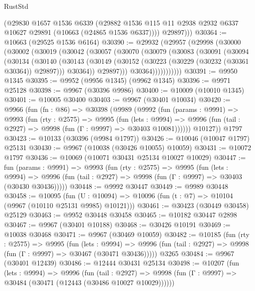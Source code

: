 \begin{lexlean}{RustStd}
\begin{coremodule}
          (@29830
            @1657
            @1536
            @6339
            (@29882 @1536 @115 @11 @2938 @2932 @6337 @10627 @29891 (@10663 (@24865 @1536 @6337))))
          @29897)))
@30364 := @10663 (@29525 @1536 @6164)
@30390 := @29932
    (@29957
      (@29998
        (@30000
          (@30002
            (@30019
              (@30042
                (@30057
                  (@30070
                    (@30079
                      (@30083
                        (@30091
                          (@30094
                            (@30134
                              (@30140
                                (@30143
                                  (@30149
                                    (@30152 (@30223 (@30229 (@30232 (@30361 @30364)) @29897)))
                                    @30364))
                                @29897)))
                          @30364)))))))))))
@30391 := @9950 @1345
@30395 := @9952 (@9956 @1345) (@9962 @1345)
@30396 := @9971 @25128
@30398 := @9967 (@30396 @9986)
@30400 := @10009 (@10010 @1345)
@30401 := @10005 @30400
@30403 := @9967 (@30401 @10034)
@30420 := @9966
    (fun (fn : @86) =>
    @30398
      (@9989
        (@9992
          (fun (params : @9991) =>
          @9993
            (fun (rty : @2575) =>
            @9995
              (fun (lets : @9994) =>
              @9996 (fun (tail : @2927) => @9998 (fun (Γ : @9997) => @30403 @10081))))))
        @10127))
    @1797
@30423 := @10133 (@30396 (@9984 @1797))
@30426 := @10046 (@10047 @1797) @25131
@30430 := @9967 (@10038 (@30426 @10055) @10059)
@30431 := @10072 @1797
@30436 := @10069 (@10071 @30431 @25134 @10027 @10029)
@30447 := fun (params : @9991) =>
  @9993
    (fun (rty : @2575) =>
    @9995
      (fun (lets : @9994) =>
      @9996 (fun (tail : @2927) => @9998 (fun (Γ : @9997) => @30403 (@30430 @30436)))))
@30448 := @9992 @30447
@30449 := @9989 @30448
@30458 := @10095
    (fun (U : @10094) => @10096 (fun (t : @7) => @10104 (@9967 (@10110 @25131 @9985) @10121)))
@30461 := @30423 (@30449 @30458) @25129
@30463 := @9952 @30448 @30458
@30465 := @10182 @30447 @2898
@30467 := @9967 (@30401 @10188)
@30468 := @30426 @10191
@30469 := @10038 @30468
@30471 := @9967 (@30469 @10059)
@30482 := @10185
    (fun (rty : @2575) =>
    @9995
      (fun (lets : @9994) =>
      @9996 (fun (tail : @2927) => @9998 (fun (Γ : @9997) => @30467 (@30471 @30436)))))
    @3265
@30484 := @9967 (@30401 @12439)
@30486 := @12444 @30431 @25134
@30498 := @10207
    (fun (lets : @9994) =>
    @9996
      (fun (tail : @2927) =>
      @9998 (fun (Γ : @9997) => @30484 (@30471 (@12443 (@30486 @10027 @10029))))))

\end{coremodule}
\end{lexlean}
